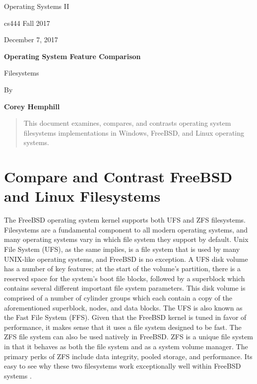 \documentclass[letterpaper,10pt,draftclsnofoot,onecolumn]{IEEEtran}
\def \Author{Corey Hemphill}
\def \Title{Operating System Feature Comparison}
\def \Subtitle{Filesystems}
\def \Term{cs444 Fall 2017}
\def \DueDate{December 7, 2017}
\def \DocType{
	Operating Systems II
}
\begin{document}
\begin{titlepage}
    \begin{singlespace}
        \hfill  
        \par\vspace{.2in}
        \centering
        \scshape {
            \huge  \DocType \par
           	\huge \Term \par
            {\large \DueDate}\par
            \vspace{.5in}
            \textbf{\Huge \Title}\par
            {\large \Subtitle}\par
            \vspace{.5in}          
            {\large By }\par
           	\textbf{\Author}\par
            \vspace{5pt}
            }
            \vspace{120pt}
        
        \begin{abstract}
        This document examines, compares, and contrasts operating system filesystems implementations in Windows, FreeBSD, and Linux operating systems.
        \end{abstract}
        
    \end{singlespace}
\end{titlepage}
\newpage

\section{Compare and Contrast FreeBSD and Linux Filesystems}
\noindent  The FreeBSD operating system kernel supports both UFS and ZFS filesystems. Filesystems are a fundamental component to all modern operating systems, and many operating systems vary in which file system they support by default. Unix File System (UFS), as the same implies, is a file system that is used by many UNIX-like operating systems, and FreeBSD is no exception. A UFS disk volume has a number of key features; at the start of the volume’s partition, there is a reserved space for the system’s boot file blocks, followed by a superblock which contains several different important file system parameters. This disk volume is comprised of a number of cylinder groups which each contain a copy of the aforementioned superblock, nodes, and data blocks. The UFS is also known as the Fast File System (FFS). Given that the FreeBSD kernel is tuned in favor of performance, it makes sense that it uses a file system designed to be fast. The ZFS file system can also be used natively in FreeBSD. ZFS is a unique file system in that it behaves as both the file system and as a system volume manager. The primary perks of ZFS include data integrity, pooled storage, and performance. Its easy to see why these two filesystems work exceptionally well within FreeBSD systems \cite{FreeBSD1FS} \cite{FreeBSD2FS} \cite{FreeBSD3FS}.\\
\end{document}
